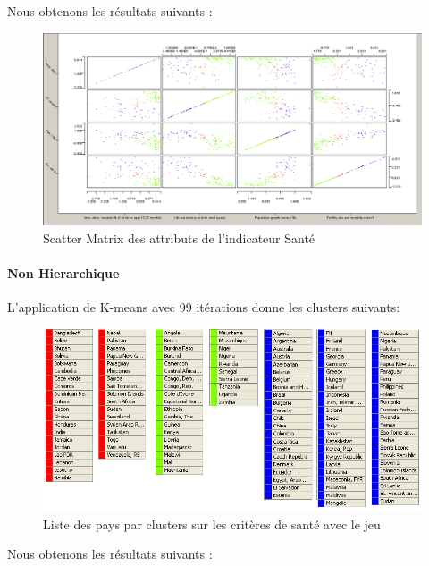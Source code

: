 Nous obtenons les résultats suivants : 

\begin{figure}[H]
	\begin{center}
		\includegraphics[scale=0.5]{Image/ScatterMatrixSanteNoMissing2}
		\caption{Scatter Matrix des attributs de l'indicateur Santé \jeuc}
	\end{center}
\end{figure}


\paragraph{Non Hierarchique}
L'application de K-means avec 99 itérations donne les clusters suivants: 

\begin{figure}[H]
	\begin{center}
		\includegraphics[scale=0.5]{Image/TableViewSanteKmeansNoMissing2}
		\caption{Liste des pays par clusters sur les critères de santé avec le jeu \jeuc}
	\end{center}
\end{figure}


Nous obtenons les résultats suivants : 

